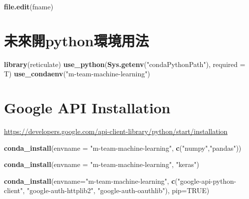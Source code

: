 \documentclass[]{book}
\newenvironment{Shaded}{\begin{snugshade}}{\end{snugshade}}
\newcommand{\KeywordTok}[1]{\textcolor[rgb]{0.13,0.29,0.53}{\textbf{#1}}}
\newcommand{\DataTypeTok}[1]{\textcolor[rgb]{0.13,0.29,0.53}{#1}}
\newcommand{\StringTok}[1]{\textcolor[rgb]{0.31,0.60,0.02}{#1}}
\newcommand{\OtherTok}[1]{\textcolor[rgb]{0.56,0.35,0.01}{#1}}
\newcommand{\NormalTok}[1]{#1}
\begin{document}
\begin{Shaded}
\begin{Highlighting}[]
\KeywordTok{file.edit}\NormalTok{(fname)}
\end{Highlighting}
\end{Shaded}

\hypertarget{python}{%
\section{未來開python環境用法}\label{python}}

\begin{Shaded}
\begin{Highlighting}[]
\KeywordTok{library}\NormalTok{(reticulate)}
\KeywordTok{use_python}\NormalTok{(}\KeywordTok{Sys.getenv}\NormalTok{(}\StringTok{"condaPythonPath"}\NormalTok{),}
           \DataTypeTok{required =}\NormalTok{ T)}
\KeywordTok{use_condaenv}\NormalTok{(}\StringTok{"m-team-machine-learning"}\NormalTok{)}
\end{Highlighting}
\end{Shaded}

\hypertarget{google-api-installation}{%
\section{Google API Installation}\label{google-api-installation}}

\url{https://developers.google.com/api-client-library/python/start/installation}

\begin{Shaded}
\begin{Highlighting}[]
\KeywordTok{conda_install}\NormalTok{(}\DataTypeTok{envname =} \StringTok{"m-team-machine-learning"}\NormalTok{,}
              \KeywordTok{c}\NormalTok{(}\StringTok{"numpy"}\NormalTok{,}\StringTok{"pandas"}\NormalTok{))}
\end{Highlighting}
\end{Shaded}

\begin{Shaded}
\begin{Highlighting}[]
\KeywordTok{conda_install}\NormalTok{(}\DataTypeTok{envname =} \StringTok{"m-team-machine-learning"}\NormalTok{,}
              \StringTok{"keras"}\NormalTok{)}
\end{Highlighting}
\end{Shaded}

\begin{Shaded}
\begin{Highlighting}[]
\KeywordTok{conda_install}\NormalTok{(}\DataTypeTok{envname=}\StringTok{"m-team-machine-learning"}\NormalTok{,}
              \KeywordTok{c}\NormalTok{(}\StringTok{"google-api-python-client"}\NormalTok{,}
                \StringTok{"google-auth-httplib2"}\NormalTok{,}
                \StringTok{"google-auth-oauthlib"}\NormalTok{),}
              \DataTypeTok{pip=}\OtherTok{TRUE}\NormalTok{)}
\end{Highlighting}
\end{Shaded}
\end{document}
